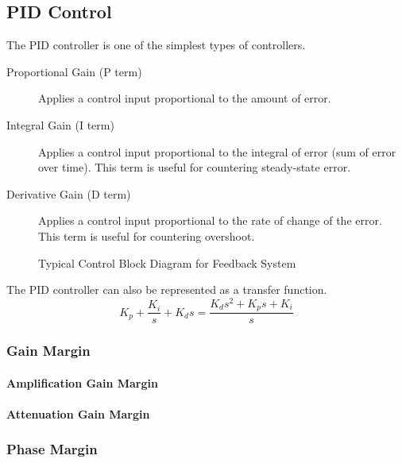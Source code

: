 \documentclass[../notes.tex]{subfiles}
\begin{document}
\subsection{PID Control}
The PID controller is one of the simplest types of controllers.
\begin{description}
    \item[Proportional Gain (P term)] Applies a control input proportional to the amount of error.
    \item[Integral Gain (I term)] Applies a control input proportional to the integral of error (sum of error over time). This term is useful for countering steady-state error.
    \item[Derivative Gain (D term)] Applies a control input proportional to the rate of change of the error. This term is useful for countering overshoot.
\end{description}

\begin{figure}[H]
    \centering

    \caption{Typical Control Block Diagram for Feedback System}
    \label{fig:typicalBlock}
\end{figure}

The PID controller can also be represented as a transfer function.
\begin{equation} \label{eq:PIDTF}
    K_p + \frac{K_i}{s} + K_d s = \frac{K_ds^2 + K_ps + K_i}{s}
\end{equation}

\subsubsection{Gain Margin}
\paragraph{Amplification Gain Margin}
\paragraph{Attenuation Gain Margin}

\subsubsection{Phase Margin}
\end{document}
